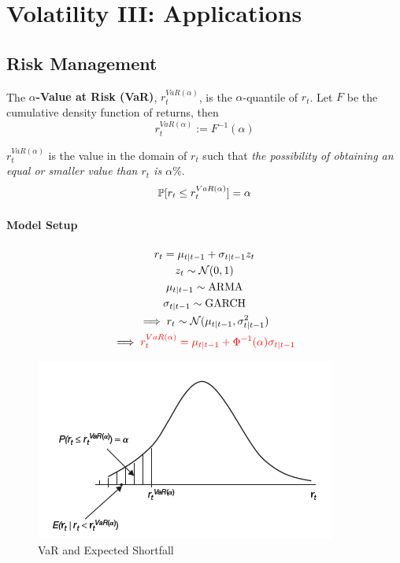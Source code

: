 \documentclass[11pt]{article}
\begin{document}
	
	\section{Volatility III: Applications}
		\subsection{Risk Management}
			\begin{definition}
				The \textbf{$\alpha$-Value at Risk (VaR)}, $r_t^{VaR(\alpha)}$, is the $\alpha$-quantile of $r_t$. Let $F$ be the cumulative density function of returns, then
				\begin{equation}
					r_t^{VaR(\alpha)} := F^{-1}(\alpha)
				\end{equation}
			\end{definition}
			
			\begin{remark}[Interpretation]
				$r_t^{VaR(\alpha)}$ is the value in the domain of $r_t$ such that \emph{the possibility of obtaining an equal or smaller value than $r_t$ is $\alpha \%$}.
				\begin{equation}
					\mathbb{P}[{r_t \leq r_t^{VaR(\alpha)}}] = \alpha
				\end{equation}
			\end{remark}
	
			\paragraph{Model Setup}
				\begin{gather}
					r_t = \mu_{t|t-1} + \sigma_{t|t-1}z_t \\
					z_t \sim \mathcal{{N}}(0, 1) \\
					\mu_{t|t-1} \sim \text{{ARMA}} \\
					\sigma_{t|t-1} \sim \text{{GARCH}} \\
					\implies r_t \sim \mathcal{{N}}(\mu_{t|t-1}, \sigma_{t|t-1}^2) \\
					\implies \textcolor{red}{r_t^{VaR(\alpha)} = \mu_{t|t-1} + \Phi^{-1}(\alpha) \sigma_{t|t-1}}
				\end{gather}
				
			\begin{figure}[h]
				\centering
				\includegraphics[width=0.7\linewidth]{figures/lec12.png}
				\caption{VaR and Expected Shortfall}
			\end{figure}
			
\end{document}
